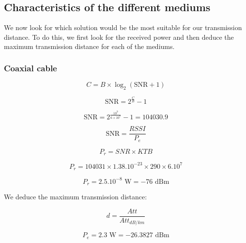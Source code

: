 \documentclass[12]{article}
\begin{document}
\subsection{Characteristics of the different mediums}

We now look for which solution would be the most suitable for our transmission distance. To do this, we first look for the received power and then deduce the maximum transmission distance for each of the mediums.


\subsubsection{Coaxial cable}

\begin{equation*}
    C = B \times \log_2 \left( \text{SNR} + 1 \right)
\end{equation*}

\begin{equation*}
    \text{SNR} = 2^{\frac{C}{B}} - 1
\end{equation*}

\begin{equation*}
    \text{SNR} = 2^{ \frac{10^9}{6 \times 10^7}} -1 = 104030.9
\end{equation*}

\begin{equation*}
    \text{SNR} = \frac{RSSI}{P_e}
\end{equation*}

\begin{equation*}
    P_r = SNR \times KTB
\end{equation*}

\begin{equation*}
    P_r = 104031 \times 1.38.10^{-23} \times 290 \times 6.10^7
\end{equation*}

\begin{equation*}
    P_r = 2.5.10^{-8} \text{ W} = -76 \text{ dBm}
\end{equation*}

We deduce the maximum transmission distance:

\begin{equation*}
    d = \frac{Att}{Att_{dB/km}}
\end{equation*}

\begin{equation*}
    P_e = 2.3 \text{ W} = -26.3827 \text{ dBm}
\end{equation*}
\end{document}
